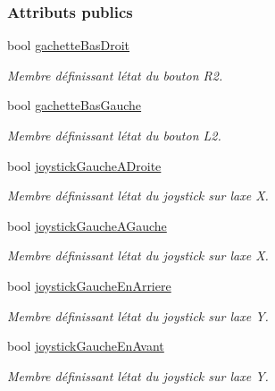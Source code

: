 \subsubsection*{Attributs publics}
\begin{DoxyCompactItemize}
\item 
bool \hyperlink{struct_etat_manette_deplacement_a4588620c1e2a3543ce67c9a791aac106}{gachette\+Bas\+Droit}
\begin{DoxyCompactList}\small\item\em Membre définissant l\textquotesingle{}état du bouton R2. \end{DoxyCompactList}\item 
bool \hyperlink{struct_etat_manette_deplacement_a0d197e25bc2e0402a068a8d012c25472}{gachette\+Bas\+Gauche}
\begin{DoxyCompactList}\small\item\em Membre définissant l\textquotesingle{}état du bouton L2. \end{DoxyCompactList}\item 
bool \hyperlink{struct_etat_manette_deplacement_a8fa93da5af430ac00ffd4ee8b76987a2}{joystick\+Gauche\+A\+Droite}
\begin{DoxyCompactList}\small\item\em Membre définissant l\textquotesingle{}état du joystick sur l\textquotesingle{}axe X. \end{DoxyCompactList}\item 
bool \hyperlink{struct_etat_manette_deplacement_af7e92a8d8f116e2bc4a5a95386f604e7}{joystick\+Gauche\+A\+Gauche}
\begin{DoxyCompactList}\small\item\em Membre définissant l\textquotesingle{}état du joystick sur l\textquotesingle{}axe X. \end{DoxyCompactList}\item 
bool \hyperlink{struct_etat_manette_deplacement_a584cf1538425c87588c5b96b79c8d482}{joystick\+Gauche\+En\+Arriere}
\begin{DoxyCompactList}\small\item\em Membre définissant l\textquotesingle{}état du joystick sur l\textquotesingle{}axe Y. \end{DoxyCompactList}\item 
bool \hyperlink{struct_etat_manette_deplacement_a8c8e3ca694408bc6a6ced4e20b9da0be}{joystick\+Gauche\+En\+Avant}
\begin{DoxyCompactList}\small\item\em Membre définissant l\textquotesingle{}état du joystick sur l\textquotesingle{}axe Y. \end{DoxyCompactList}\end{DoxyCompactItemize}


